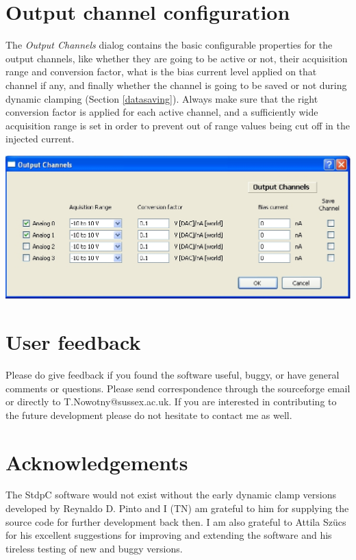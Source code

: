 \documentclass{article}
\begin{document}
\section{Output channel configuration} \label{outchnconfig}

The \emph{Output Channels} dialog contains the basic configurable properties
for the output channels, like whether they are going to be active or not,
their acquisition range and conversion factor, what is the bias current
level applied on that channel if any, and finally whether the channel is
going to be saved or not during dynamic clamping (Section
\ref{datasaving}). Always make sure that the right conversion factor is
applied for each active channel, and a sufficiently wide acquisition range
is set in order to prevent out of range values being cut off in the
injected current.

\includegraphics[scale=0.6]{outputChnDialog}


\section{User feedback} 
Please do give feedback if you found the software useful, buggy, or
have general comments or questions. Please send correspondence through
the sourceforge email or directly to T.Nowotny@sussex.ac.uk.
If you are interested in contributing to the future development please
do not hesitate to contact me as well.  
 
\section{Acknowledgements} 
 
The StdpC software would not exist without the early dynamic clamp
versions developed by Reynaldo D. Pinto and I (TN) am grateful to him
for supplying the source code for further development back then. I am
also grateful to Attila Sz\"ucs for his excellent suggestions for
improving and extending the software and his tireless testing of new
and buggy versions.



\end{document}
